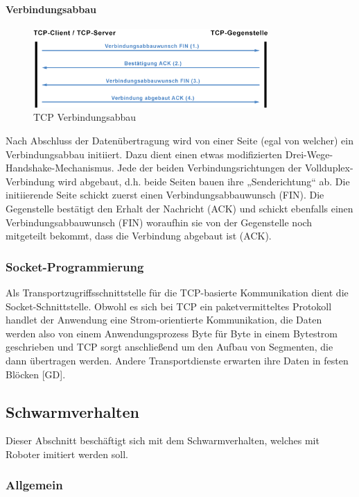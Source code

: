 \paragraph{Verbindungsabbau}
\begin{figure}[ht]
	\centering
	\includegraphics[width=0.8\textwidth]{images/Verbindungsabbau.png}
	\caption[TCP Verbindungsabbau]{TCP Verbindungsabbau}
	\label{fig:<Sprungmakre>}
\end{figure}
Nach Abschluss der Datenübertragung wird von einer Seite (egal von welcher) ein Verbindungsabbau initiiert. Dazu dient einen etwas modifizierten Drei-Wege-Handshake-Mechanismus. Jede der beiden Verbindungsrichtungen der Vollduplex-Verbindung wird abgebaut, d.h. beide Seiten bauen ihre „Senderichtung“ ab. Die initiierende Seite schickt zuerst einen Verbindungsabbauwunsch (FIN). Die Gegenstelle bestätigt den Erhalt der Nachricht (ACK) und schickt ebenfalls einen Verbindungsabbauwunsch (FIN) woraufhin sie von der Gegenstelle noch mitgeteilt bekommt, dass die Verbindung abgebaut ist (ACK).
\subsubsection{Socket-Programmierung}
Als Transportzugriffsschnittstelle für die TCP-basierte Kommunikation dient die Socket-Schnittstelle.
Obwohl es sich bei TCP ein paketvermitteltes Protokoll handlet der Anwendung eine Strom-orientierte Kommunikation, die Daten werden also von einem Anwendungsprozess Byte für Byte in einem Bytestrom geschrieben und TCP sorgt anschließend um den Aufbau von Segmenten, die dann übertragen werden. Andere Transportdienste erwarten ihre Daten in festen Blöcken [GD].

\newpage
\color{finishing}
\subsection{Schwarmverhalten}

Dieser Abschnitt beschäftigt sich mit dem Schwarmverhalten, welches mit Roboter imitiert werden soll.

\subsubsection{Allgemein}

